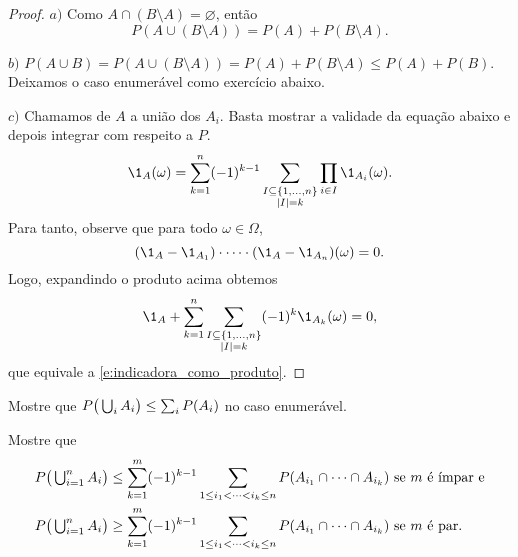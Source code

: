 \documentclass[../main/Notas_de_aula.tex]{subfiles}
\begin{document}
\begin{proof}
  $a)$ Como $A \cap (B \setminus A) = \varnothing$, então
    \begin{equation}
        P(A \cup (B \setminus A))= P(A) + P(B \setminus A).
  \end{equation}

  $b)$ $P(A \cup B) = P (A \cup (B \setminus A)) = P(A) + P(B \setminus
    A) \leq P(A) + P(B)$.\\
    Deixamos o caso enumerável como exercício abaixo.

  $c)$ Chamamos de $A$ a união dos $A_i$.
Basta mostrar a validade da equação abaixo e depois integrar com
    respeito a $P$.
    \begin{equation}
      \label{e:indicadora_como_produto}
      \1_A(\omega) = \sum_{k=1}^n (-1)^{k - 1} \sum_{\substack{I \subseteq \{1, \dots, n\}\\|I| = k}} \prod_{i \in I} \1_{A_i}(\omega).
    \end{equation}
    Para tanto, observe que para todo $\omega \in \Omega$,
    \begin{equation}
      (\1_A - \1_{A_1}) \cdot \dots \cdot (\1_A - \1_{A_n})(\omega) = 0.
    \end{equation}
    Logo, expandindo o produto acima obtemos
    \begin{equation}
      \1_A + \sum_{k = 1}^n \sum_{\substack{I \subseteq \{1, \dots, n\}\\|I| = k}} (-1)^k \1_{A_k}(\omega) = 0,
    \end{equation}
    que equivale a \eqref{e:indicadora_como_produto}.
\end{proof}

\begin{exercise}
  Mostre que $P\big(\operatorname*{{\textstyle \bigcup}}\nolimits_i A_i\big) \leq \sum_i P(A_i)$ no caso enumerável.
\end{exercise}

\begin{exercise}
  Mostre que
  \begin{equation*}
    \begin{split}
      P\big( \operatorname*{{\textstyle \bigcup}}\nolimits_{i=1}^n A_i \big) & \leq \sum\limits_{k = 1}^m (-1)^{k-1} \sum\limits_{1 \leq i_1 < \dots < i_k \leq n} P(A_{i_1} \cap \dots \cap A_{i_k}) \text{ se $m$ é ímpar e}\\
      P\big( \operatorname*{{\textstyle \bigcup}}\nolimits_{i=1}^n A_i \big) & \geq \sum\limits_{k = 1}^m (-1)^{k-1} \sum\limits_{1 \leq i_1 < \dots < i_k \leq n} P(A_{i_1} \cap \dots \cap A_{i_k}) \text{ se $m$ é par.}
    \end{split}
  \end{equation*}
\end{exercise}
\end{document}

